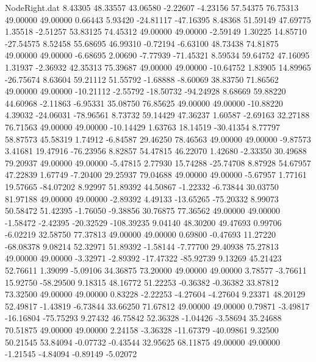 \begin{filecontents}{NodeRight.dat}
   8.43305   48.33557   43.06580    -2.22607   -4.23156   57.54375   76.75313   49.00000   49.00000    0.66443    5.93420  -24.81117  -47.16395
   8.48368   51.59149   47.69775     1.35518   -2.51257   53.83125   74.45312   49.00000   49.00000   -2.59149    1.30225   14.85710  -27.54575
   8.52458   55.68695   46.99310    -0.72194   -6.63100   48.73438   74.81875   49.00000   49.00000   -6.68695    2.00690   -7.77939  -71.45321
   8.59534   59.64752   47.16095     1.31937   -2.36932   42.35313   75.39687   49.00000   49.00000  -10.64752    1.83905   14.89965  -26.75674
   8.63604   59.21112   51.55792    -1.68888   -8.60069   38.83750   71.86562   49.00000   49.00000  -10.21112   -2.55792  -18.50732  -94.24928
   8.68669   59.88220   44.60968    -2.11863   -6.95331   35.08750   76.85625   49.00000   49.00000  -10.88220    4.39032  -24.06031  -78.96561
   8.73732   59.14429   47.36237     1.60587   -2.69163   32.27188   76.71563   49.00000   49.00000  -10.14429    1.63763   18.14519  -30.41354
   8.77797   58.87573   45.58319     1.74912   -6.84587   29.46250   78.46563   49.00000   49.00000   -9.87573    3.41681   19.47916  -76.23956
   8.82857   54.47815   46.22070     1.42680   -2.33350   30.49688   79.20937   49.00000   49.00000   -5.47815    2.77930   15.74288  -25.74708
   8.87928   54.67957   47.22839     1.67749   -7.20400   29.25937   79.04688   49.00000   49.00000   -5.67957    1.77161   19.57665  -84.07202
   8.92997   51.89392   44.50867    -1.22332   -6.73844   30.03750   81.97188   49.00000   49.00000   -2.89392    4.49133  -13.65265  -75.20332
   8.99073   50.58472   51.42395    -1.76050   -9.38856   30.76875   77.36562   49.00000   49.00000   -1.58472   -2.42395  -20.32529 -108.39235
   9.04140   48.30200   49.47693     0.99706   -6.02219   32.58750   77.37813   49.00000   49.00000    0.69800   -0.47693   11.27220  -68.08378
   9.08214   52.32971   51.89392    -1.58144   -7.77700   29.40938   75.27813   49.00000   49.00000   -3.32971   -2.89392  -17.47322  -85.92739
   9.13269   45.21423   52.76611     1.39099   -5.09106   34.36875   73.20000   49.00000   49.00000    3.78577   -3.76611   15.92750  -58.29500
   9.18315   48.16772   51.22253    -0.36382   -0.36382   33.87812   73.32500   49.00000   49.00000    0.83228   -2.22253   -4.27604   -4.27604
   9.23371   48.20129   52.49817    -1.43819   -6.73844   33.66250   71.67812   49.00000   49.00000    0.79871   -3.49817  -16.16804  -75.75293
   9.27432   46.75842   52.36328    -1.04426   -3.58694   35.24688   70.51875   49.00000   49.00000    2.24158   -3.36328  -11.67379  -40.09861
   9.32500   50.21545   53.84094    -0.07732   -0.43544   32.95625   68.11875   49.00000   49.00000   -1.21545   -4.84094   -0.89149   -5.02072

\end{filecontents}
